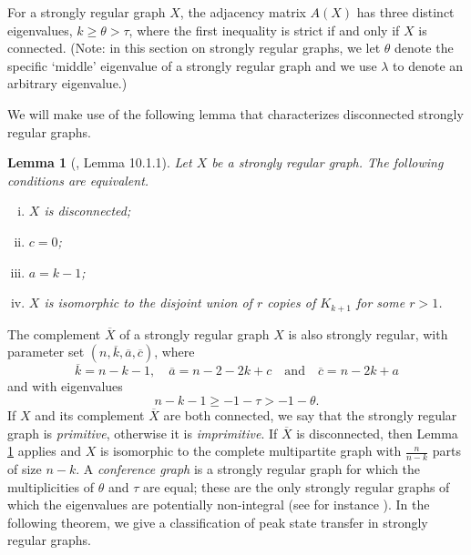 \documentclass{article}
\newtheorem{lemma}[theorem]{Lemma}
\numberwithin{equation}{section}
\begin{document}
For a strongly regular graph $X$, the adjacency matrix $A(X)$ has three distinct eigenvalues, $k\geq  \theta >\tau$, where  the first inequality is strict if and only if $X$ is connected. (Note: in this section on strongly regular graphs, we let $\theta$ denote the specific `middle' eigenvalue of a strongly regular graph and we use $\lambda$ to denote an arbitrary eigenvalue.)

We will make use of the  following lemma that characterizes disconnected strongly regular graphs.

\begin{lemma}[\cite{GodRoy2001}, Lemma 10.1.1]
\label{lem:godsil_royle_imprimitive}
Let $X$ be a strongly regular graph. The following conditions are equivalent. 
\begin{enumerate}[(i)]
\item $X$ is disconnected;
\item $c = 0$;
\item $a = k-1$;
\item $X$ is isomorphic to the disjoint union of $r$ copies of $K_{k+1}$ for some $r > 1$.
\end{enumerate}
\end{lemma}

The complement $\overline{X}$ of a strongly regular graph $X$ is also strongly regular, with parameter set $(n,\overline{k},\overline{a},\overline{c})$, where
\begin{equation}
\label{eq:srg_complement_parameters}
\overline{k} = n-k-1, \quad \overline{a} = n-2-2k+c \quad \text{and} \quad \overline{c} = n-2k+a
\end{equation}
and with eigenvalues
\begin{equation}
\label{eq:srg_complement_eigenvalues}
n-k-1 \geq -1 -\tau > -1 - \theta.
\end{equation}
If $X$ and its complement $\overline{X}$ are both connected, we say that the strongly regular graph is \textsl{primitive}, otherwise it is \textsl{imprimitive}. If $\overline{X}$ is disconnected, then Lemma \ref{lem:godsil_royle_imprimitive} applies and $X$ is isomorphic to the complete multipartite graph with $\frac{n}{n-k}$ parts of size $n-k$. A \textsl{conference graph} is a strongly regular graph for which the multiplicities of $\theta$ and $\tau$ are equal; these are the only strongly regular graphs of which the eigenvalues are potentially non-integral (see for instance \cite[Lemma 10.3.3]{GodRoy2001}). In the following theorem, we give a classification of peak state transfer in strongly regular graphs.
\end{document}
